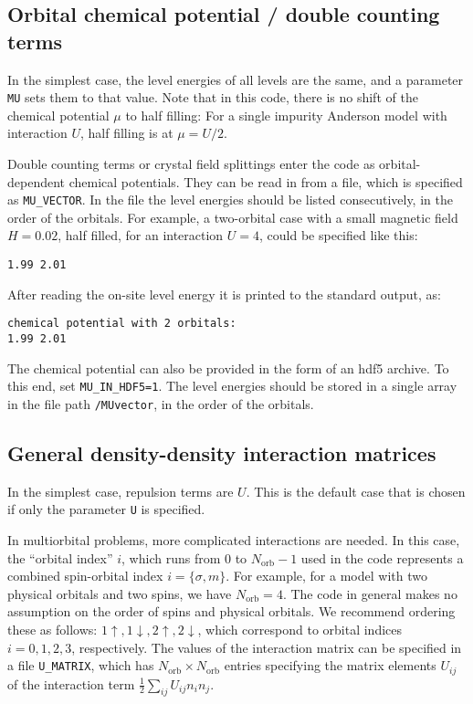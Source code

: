\documentclass[aps,prb,floatfix,superscriptaddress,twocolumn,notitlepage]{revtex4-1}
\begin{document}
\subsection{Orbital chemical potential / double counting terms}
\label{sec:mu}
In the simplest case, the level energies of all levels are the same, and a parameter \verb#MU# sets them to that value. Note that in this code, there is no shift of the chemical potential $\mu$ to half filling: For a single impurity Anderson model with interaction $U$, half filling is at $\mu=U/2$.

Double counting terms or crystal field splittings enter the code as orbital-dependent chemical potentials. They can be read in from a file, which is specified as \verb#MU_VECTOR#. In the file the level energies should be listed consecutively, in the order of the orbitals. For example, a two-orbital case with a small magnetic field $H=0.02$, half filled, for an interaction $U=4$, could be specified like this:
\begin{verbatim}
1.99 2.01
\end{verbatim}
After reading the on-site level energy it is printed to the standard output, as:
\begin{verbatim}
chemical potential with 2 orbitals: 
1.99 2.01 
\end{verbatim}
The chemical potential can also be provided in the form of an hdf5 archive. To this end, set \verb#MU_IN_HDF5=1#. The level energies should be stored in a single array in the file path \verb#/MUvector#, in the order of the orbitals.

\subsection{General density-density interaction matrices}
\label{umatrix}
In the simplest case, repulsion terms are $U$. This is the default case that is chosen if only the parameter \verb#U# is specified.

In multiorbital problems, more complicated interactions are needed.
In this case, the ``orbital index'' $i$, which runs from $0$ to $N_{\text{orb}}-1$ used in the code represents a combined spin-orbital index $i=\{\sigma,m\}$. For example, for a model with two physical orbitals and two spins, we have $N_{\text{orb}}=4$.
The code in general makes no assumption on the order of spins and physical orbitals. 
We recommend ordering these as follows: $1\uparrow, 1\downarrow, 2\uparrow, 2\downarrow$, which correspond to orbital indices $i=0,1,2,3$, respectively.
The values of the interaction matrix can be specified in a file \verb#U_MATRIX#, which has $N_\text{orb}\times N_\text{orb}$ entries specifying the matrix elements $U_{ij}$ of the interaction term $\frac{1}{2}\sum_{ij}U_{ij}n_i n_j$.
\end{document}
